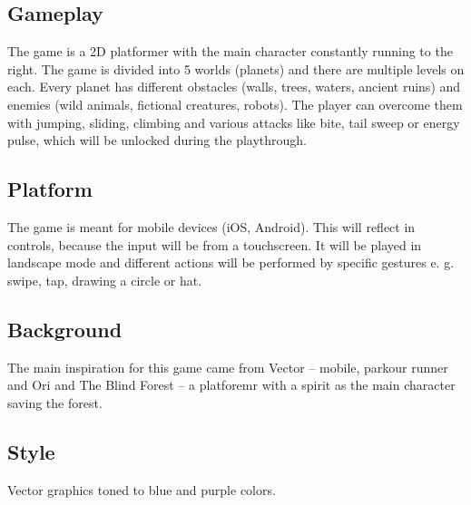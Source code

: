 \documentclass[a4paper,10pt,english]{article}
\begin{document}
\subsection*{Gameplay}
The game is a 2D platformer with the main character constantly running to the right. The game is divided into 5 worlds (planets) and there are multiple levels on each. Every planet has different obstacles (walls, trees, waters, ancient ruins) and enemies (wild animals, fictional creatures, robots). The player can overcome them with jumping, sliding, climbing and various attacks like bite, tail sweep or energy pulse, which will be unlocked during the playthrough.

\subsection*{Platform}
The game is meant for mobile devices (iOS, Android). This will reflect in controls, because the input will be from a touchscreen. It will be played in landscape mode and different actions will be performed by specific gestures e. g. swipe, tap, drawing a circle or hat.

\subsection*{Background}
The main inspiration for this game came from Vector – mobile, parkour runner and Ori and The Blind Forest – a platforemr with a spirit as the main character saving the forest.

\subsection*{Style}
Vector graphics toned to blue and purple colors.
\end{document}
